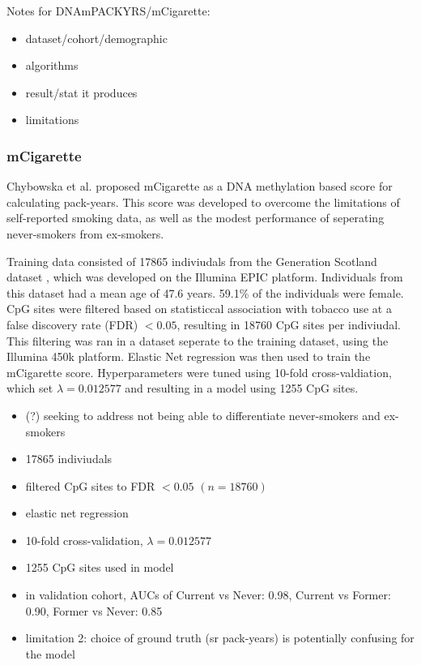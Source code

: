\documentclass{article}
\begin{document}
Notes for DNAmPACKYRS/mCigarette:
\begin{itemize}
    \item dataset/cohort/demographic
    \item algorithms
    \item result/stat it produces
    \item limitations
\end{itemize}

\subsubsection{mCigarette} \label{sec:mcigarette}
Chybowska et al. \cite{chybowska2025blood} proposed mCigarette as a DNA methylation based score for calculating pack-years. This score was developed to overcome the limitations of self-reported smoking data, as well as the modest performance of seperating never-smokers from ex-smokers.

Training data consisted of \num{17865} indiviudals from the Generation Scotland dataset \cite{smith2006generation}, which was developed on the Illumina EPIC platform. Individuals from this dataset had a mean age of 47.6 years. 59.1\% of the individuals were female. CpG sites were filtered based on statisticcal association with tobacco use at a false discovery rate (FDR) \(< 0.05\), resulting in \num{18760} CpG sites per indiviudal. This filtering was ran in a dataset seperate to the training dataset, using the Illumina 450k platform. Elastic Net regression was then used to train the mCigarette score. Hyperparameters were tuned using 10-fold cross-valdiation, which set \(\lambda = 0.012577\) and resulting in a model using \num{1255} CpG sites.

\begin{itemize}
    \item (?) seeking to address not being able to differentiate never-smokers and ex-smokers
    \item 17865 indiviudals
    \item filtered CpG sites to FDR \(< 0.05\) \((n = 18760)\)
    \item elastic net regression
    \item 10-fold cross-validation, \(\lambda = 0.012577\)
    \item 1255 CpG sites used in model
    \item in validation cohort, AUCs of Current vs Never: 0.98, Current vs Former: 0.90, Former vs Never: 0.85
    \item limitation 2: choice of ground truth (sr pack-years) is potentially confusing for the model
\end{itemize}
\end{document}
